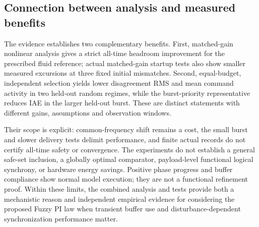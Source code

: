 \subsection{Connection between analysis and measured benefits}
\label{subsec:eval_support}

The evidence establishes two complementary benefits. First, matched-gain
nonlinear analysis gives a strict all-time headroom improvement for the
prescribed fluid reference; actual matched-gain startup tests also show
smaller measured excursions at three fixed initial mismatches. Second,
equal-budget, independent selection yields lower disagreement RMS and
mean command activity in two held-out random regimes, while the
burst-priority representative reduces IAE in the larger held-out burst.
These are distinct statements with different gains, assumptions and
observation windows.

Their scope is explicit: common-frequency shift remains a cost, the
small burst and slower delivery tests delimit performance, and finite
actual records do not certify all-time safety or convergence. The
experiments do not establish a general safe-set inclusion, a globally
optimal comparator, payload-level functional logical synchrony, or
hardware energy savings. Positive phase progress and buffer compliance
show normal model execution; they are not a functional refinement proof.
Within these limits, the combined analysis and tests provide both a
mechanistic reason and independent empirical evidence for considering
the proposed Fuzzy PI law when transient buffer use and
disturbance-dependent synchronization performance matter.


